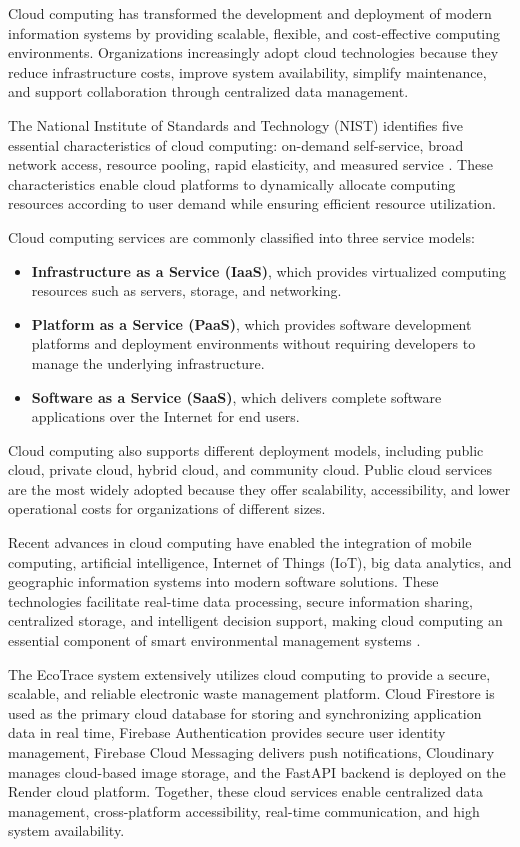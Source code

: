 Cloud computing has transformed the development and deployment of modern
information systems by providing scalable, flexible, and cost-effective computing
environments. Organizations increasingly adopt cloud technologies because they
reduce infrastructure costs, improve system availability, simplify maintenance, and
support collaboration through centralized data management.

The National Institute of Standards and Technology (NIST) identifies five
essential characteristics of cloud computing: on-demand self-service, broad
network access, resource pooling, rapid elasticity, and measured service
\citep{mell2011}. These characteristics enable cloud platforms to dynamically
allocate computing resources according to user demand while ensuring efficient
resource utilization.

Cloud computing services are commonly classified into three service models:

\begin{itemize}
  \item \textbf{Infrastructure as a Service (IaaS)}, which provides virtualized
    computing resources such as servers, storage, and networking.
  \item \textbf{Platform as a Service (PaaS)}, which provides software
    development platforms and deployment environments without requiring
    developers to manage the underlying infrastructure.
  \item \textbf{Software as a Service (SaaS)}, which delivers complete software
    applications over the Internet for end users.
\end{itemize}

Cloud computing also supports different deployment models, including public
cloud, private cloud, hybrid cloud, and community cloud. Public cloud services are
the most widely adopted because they offer scalability, accessibility, and lower
operational costs for organizations of different sizes.

Recent advances in cloud computing have enabled the integration of mobile
computing, artificial intelligence, Internet of Things (IoT), big data analytics, and
geographic information systems into modern software solutions. These
technologies facilitate real-time data processing, secure information sharing,
centralized storage, and intelligent decision support, making cloud computing an
essential component of smart environmental management systems
\citep{marinescu2022}.

The EcoTrace system extensively utilizes cloud computing to provide a secure,
scalable, and reliable electronic waste management platform. Cloud Firestore is
used as the primary cloud database for storing and synchronizing application data
in real time, Firebase Authentication provides secure user identity management,
Firebase Cloud Messaging delivers push notifications, Cloudinary manages
cloud-based image storage, and the FastAPI backend is deployed on the Render
cloud platform. Together, these cloud services enable centralized data
management, cross-platform accessibility, real-time communication, and high
system availability.

